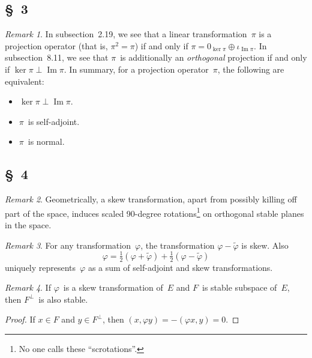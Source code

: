 \documentclass[letterpaper,12pt]{article}
\newcommand{\orth}{\perp}
\DeclareMathOperator{\im}{Im}
\newcommand{\dsum}{\oplus}
\newcommand{\oc}[1]{#1^{\perp}}
\newcommand{\iprod}[2]{(#1,#2)}
\newcommand{\adj}[1]{\widetilde{#1}}
\theoremstyle{definition}
\theoremstyle{remark}
\newtheorem*{rmk}{Remark}
\begin{document}
\subsection*{\S~3}
\begin{rmk}
In subsection~2.19, we see that a linear transformation~\(\pi\) is a projection operator (that is, \(\pi^2=\pi\)) if and only if \(\pi=0_{\ker\pi}\dsum\iota_{\im\pi}\). In subsection~8.11, we see that \(\pi\)~is additionally an \emph{orthogonal} projection if and only if \(\ker\pi\orth\im\pi\). In summary, for a projection operator~\(\pi\), the following are equivalent:
\begin{itemize}[itemsep=0pt]
\item \(\ker\pi\orth\im\pi\).
\item \(\pi\)~is self-adjoint.
\item \(\pi\)~is normal.
\end{itemize}
\end{rmk}

\subsection*{\S~4}
\begin{rmk}
Geometrically, a skew transformation, apart from possibly killing off part of the space, induces scaled 90-degree rotations\footnote{No one calls these ``scrotations''.} on orthogonal stable planes in the space.
\end{rmk}

\begin{rmk}
For any transformation~\(\varphi\), the transformation \(\varphi-\adj{\varphi}\) is skew. Also
\[\varphi=\tfrac{1}{2}(\varphi+\adj{\varphi})+\tfrac{1}{2}(\varphi-\adj{\varphi})\]
uniquely represents~\(\varphi\) as a sum of self-adjoint and skew transformations.
\end{rmk}

\begin{rmk}
If \(\varphi\)~is a skew transformation of~\(E\) and \(F\)~is stable subspace of~\(E\), then \(\oc{F}\)~is also stable.
\end{rmk}
\begin{proof}
If \(x\in F\) and \(y\in\oc{F}\), then \(\iprod{x}{\varphi y}=-\iprod{\varphi x}{y}=0\).
\end{proof}
\end{document}
